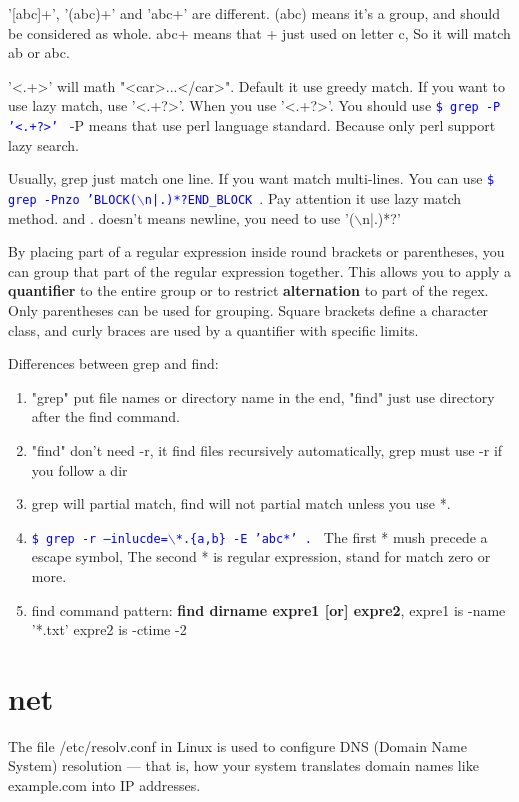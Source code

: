 \documentclass[paper=8.5in:11in, twoside, 12pt, pagesize=pdftex]{book}
\newcommand{\linuxcommand}[1]{\texttt{\textcolor{blue}{\$ #1 \Pisymbol{psy}{191}}}}
\begin{document}
		'[abc]+',  '(abc)+' and 'abc+' are different.  (abc) means it's a group, and should be considered as whole. abc+ means that + just used on letter c, So it will match ab or abc.  

		'<.+>' will math "<car>...</car>". Default it use greedy match. If you want to use lazy match, use '<.+?>'. When you use '<.+?>'.  You should use \linuxcommand{grep -P '<.+?>'} -P means that use perl language standard. Because only perl support lazy search.  

		 Usually, grep just match one line. If you want match multi-lines. You can use \linuxcommand{grep -Pnzo 'BLOCK($\backslash$n|.)*?END\_BLOCK }.  Pay attention it use lazy match method. and . doesn't means newline, you need to use '($\backslash$n|.)*?'

		By placing part of a regular expression inside round brackets or parentheses, you can group that part of the regular expression together. This allows you to apply a \textbf{quantifier} to the entire group or to restrict \textbf{alternation} to part of the regex.  Only parentheses can be used for grouping. Square brackets define a character class, and curly braces are used by a quantifier with specific limits.

		Differences between grep and find:
		\begin{enumerate}
				\item "grep" put file names or directory name in the end, "find" just use directory after the find command.
				\item "find" don't need -r, it find files recursively automatically, grep must use -r if you follow a dir

				\item grep will partial match, find will not partial match unless you use *.

				\item \linuxcommand{grep -r --inlucde=$\backslash$*.\{a,b\} -E 'abc*' .} The first * mush precede a escape symbol, The second * is regular expression, stand for match zero or more. 

				\item find command pattern: \textbf{find dirname expre1 [or] expre2}, expre1 is -name '*.txt' expre2 is -ctime -2 
		\end{enumerate}

\section{net}
The file /etc/resolv.conf in Linux is used to configure DNS (Domain Name System) resolution — that is, how your system translates domain names like example.com into IP addresses.
\end{document}
